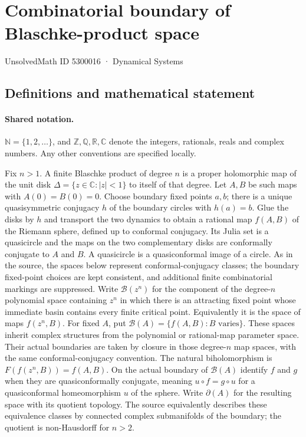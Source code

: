 \documentclass[11pt]{article}
\begin{document}
\setcounter{section}{5300015}
\section{Combinatorial boundary of Blaschke-product space}\label{5300016}
{\small\sffamily UnsolvedMath ID 5300016 · Dynamical Systems}
\subsection{Definitions and mathematical statement}

\paragraph{Shared notation.}$\mathbb N=\{1,2,\ldots\}$, and $\mathbb Z,\mathbb Q,\mathbb R,\mathbb C$ denote the integers, rationals, reals and complex numbers. Any other conventions are specified locally.


Fix $n>1$. A finite Blaschke product of degree $n$ is a proper holomorphic map of the unit disk $\Delta=\{z\in\mathbb C:|z|<1\}$ to itself of that degree. Let $A,B$ be such maps with $A(0)=B(0)=0$. Choose boundary fixed points $a,b$; there is a unique quasisymmetric conjugacy $h$ of the boundary circles with $h(a)=b$. Glue the disks by $h$ and transport the two dynamics to obtain a rational map $f(A,B)$ of the Riemann sphere, defined up to conformal conjugacy. Its Julia set is a quasicircle and the maps on the two complementary disks are conformally conjugate to $A$ and $B$. A quasicircle is a quasiconformal image of a circle. As in the source, the spaces below represent conformal-conjugacy classes; the boundary fixed-point choices are kept consistent, and additional finite combinatorial markings are suppressed.
Write $\mathcal B(z^n)$ for the component of the degree-$n$ polynomial space containing $z^n$ in which there is an attracting fixed point whose immediate basin contains every finite critical point. Equivalently it is the space of maps $f(z^n,B)$. For fixed $A$, put $\mathcal B(A)=\{f(A,B):B\text{ varies}\}$. These spaces inherit complex structures from the polynomial or rational-map parameter space. Their actual boundaries are taken by closure in those degree-$n$ map spaces, with the same conformal-conjugacy convention. The natural biholomorphism is $F(f(z^n,B))=f(A,B)$.
On the actual boundary of $\mathcal B(A)$ identify $f$ and $g$ when they are quasiconformally conjugate, meaning $u\circ f=g\circ u$ for a quasiconformal homeomorphism $u$ of the sphere. Write $\partial(A)$ for the resulting space with its quotient topology. The source equivalently describes these equivalence classes by connected complex submanifolds of the boundary; the quotient is non-Hausdorff for $n>2$.
\end{document}
